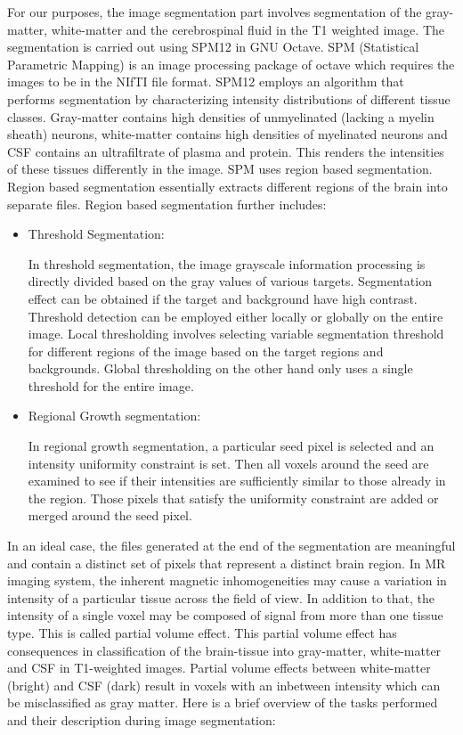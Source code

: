 \documentclass[12pt]{article}
\begin{document}
For our purposes, the image segmentation part involves segmentation of
the gray-matter, white-matter and the cerebrospinal fluid in the T1
weighted image. The segmentation is carried out using SPM12 in GNU
Octave. SPM (Statistical Parametric Mapping) is an image processing
package of octave which  requires the images to be in the NIfTI file
format. SPM12 employs an algorithm that performs segmentation by
characterizing intensity distributions of different tissue classes.
Gray-matter contains high densities of unmyelinated (lacking a myelin
sheath) neurons, white-matter contains high densities of myelinated
neurons and CSF contains an ultrafiltrate of plasma and protein. This
renders the intensities of these tissues differently in the image. SPM
uses region based segmentation. Region based segmentation essentially
extracts different regions of the brain into separate files. Region
based segmentation further includes:

\begin{itemize}

   \item Threshold Segmentation:

    In threshold segmentation, the image grayscale information
    processing is directly divided based on the gray values of various
    targets. Segmentation effect can be obtained if the target and
    background have high contrast. Threshold detection can be employed
    either locally or globally on the entire image. Local thresholding
    involves selecting variable segmentation threshold for different
    regions of the image based on the target regions and backgrounds.
    Global thresholding on the other hand only uses a single threshold
    for the entire image.

    \item Regional Growth segmentation:

      In regional growth segmentation, a particular seed pixel is
      selected  and an intensity uniformity constraint is set. Then
      all voxels around the seed are examined to see if their
      intensities are sufficiently similar to those already in the
      region. Those pixels that satisfy the uniformity constraint are
      added or merged around the seed pixel.

\end{itemize}

In an ideal case, the files generated at the end of the segmentation
are meaningful and contain a distinct set of pixels that represent a
distinct brain region. In MR imaging system, the inherent magnetic
inhomogeneities may cause a variation in intensity of a particular
tissue across the field of view. In addition to that, the intensity of
a single voxel may be composed of signal from more than one tissue
type. This is called partial volume effect. This partial volume effect
has consequences in classification of the brain-tissue into
gray-matter, white-matter and CSF in T1-weighted images. Partial
volume effects between white-matter (bright) and CSF (dark) result in
voxels with an inbetween intensity which can be misclassified as gray
matter. Here is a brief overview of the tasks performed and their
description during image segmentation:
\end{document}
